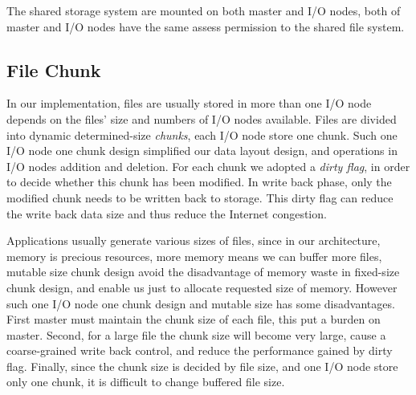 The shared storage system are mounted on both master and I/O nodes, both of master and I/O nodes
have the same assess permission to the shared file system.

\subsection{File Chunk}
In our implementation, files are usually stored in more than one I/O node depends on the files'
size and numbers of I/O nodes available.
Files are divided into dynamic determined-size \emph{chunks}, each I/O node store one chunk.
Such one I/O node one chunk design simplified our data layout design, and operations in I/O nodes addition and deletion.
  For each chunk
we adopted a \emph{dirty flag}, in order to decide whether this chunk has been modified.
In write back phase, only the modified chunk needs to be written back to storage.
This dirty flag can reduce the write back data size and thus reduce the Internet congestion.

Applications usually generate various sizes of files, since in our architecture, memory is precious
resources, more memory means we can buffer more files, mutable size chunk design avoid the
disadvantage of memory waste in fixed-size chunk design, and enable us just to allocate requested size of memory.
However such one I/O node one chunk design and mutable size has some disadvantages.
First master must maintain the chunk size of each file, this put a burden on master.
Second, for a large file the chunk size will become very large, cause a coarse-grained write back
control, and reduce the performance gained by dirty flag.
 Finally, since the chunk size is decided by
file size, and one I/O node store only one chunk, it is difficult to change buffered file size.

